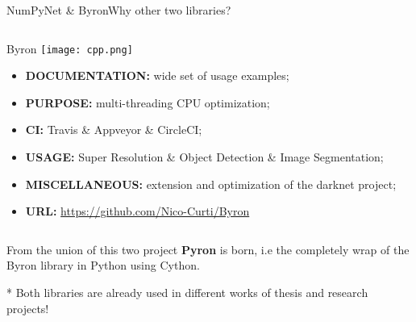 \documentclass{standalone}
\begin{document}
\begin{frame}{NumPyNet \& Byron}{Why other two libraries?}
\begin{columns}
\begin{column}{0.5\textwidth}
\begin{alertblock}{Byron \hfill\texttt{[image: cpp.png]}}
\begin{itemize}
          \item \textbf{DOCUMENTATION:} wide set of usage examples;
          \item \textbf{PURPOSE:} multi-threading CPU optimization;
          \item \textbf{CI:} Travis \& Appveyor \& CircleCI;
          \item \textbf{USAGE:} Super Resolution \& Object Detection \& Image Segmentation;
          \item \textbf{MISCELLANEOUS:} extension and optimization of the \textsf{darknet} project;
          \item \textbf{URL:} \url{https://github.com/Nico-Curti/Byron}
        \end{itemize}
      \end{alertblock}
    \end{column}

  \end{columns}

  \vspace{0.25cm}

  \scriptsize{From the union of this two project \textbf{Pyron} is born, i.e the completely wrap of the \textsf{Byron} library in \textsf{Python} using \textsf{Cython}.}

  \scriptsize{* Both libraries are already used in different works of thesis and research projects!}

\end{frame}
\end{document}
